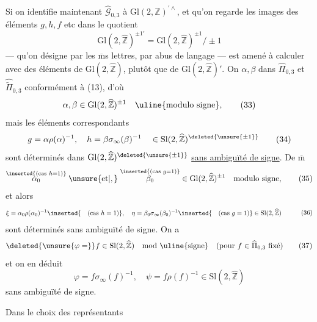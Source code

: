 
Si on identifie maintenant $\widehat{\mathcal G}_{0,3}$ à $\mathrm{Gl}(2,\mathbb Z)^{\prime\wedge}$, et qu'on regarde les  images des éléments $g,h,f$ etc dans le quotient
\[
 \mathrm{Gl}(2,\widehat{\mathbb Z})^{\pm1\prime}
 =\mathrm{Gl}(2,\widehat{\mathbb Z})^{\pm1}/\pm1
\]
--- qu'on désigne par les $\overline{\mathrm m}$s lettres, par abus de langage ---  est amené à calculer avec des éléments de $\mathrm{Gl}(2,\widehat{\mathbb Z})$, plutôt que de $\mathrm{Gl}(2,\widehat{\mathbb Z})'$. On  $\alpha,\beta$ dans $\widehat{\Pi}_{0,3}$ et $\widehat{\widetilde{\Pi}}_{0,3}$ conformément à (13), d'où
\[
 \alpha,\beta\in\mathrm{Gl}(2,\widehat{\mathbb Z})^{\pm1}
 \quad\text{\uline{modulo signe}},
 \tag{33}
\]
mais les éléments correspondants
\[
 g=\alpha\rho(\alpha)^{-1},\quad
 h=\beta\sigma_\infty(\beta)^{-1}
 \quad\in\mathrm{Sl}(2,\widehat{\mathbb Z})^{\deleted{\unsure{\pm1}}}
 \tag{34}
\]
sont déterminés dans $\mathrm{Gl}(2,\widehat{\mathbb Z})^{\deleted{\unsure{\pm1}}}$ \uline{sans ambiguïté de signe}. De $\overline{\mathrm m}$
\[
 \overset{\inserted{\text{(cas }h=1\text{)}}}{\alpha_0}
 \;\unsure{\text{et}|,}\;
 \overset{\inserted{\text{(cas }g=1\text{)}}}{\beta_0}
 \in\mathrm{Gl}(2,\widehat{\mathbb Z})^{\pm1}
 \quad\text{modulo signe},
 \tag{35}
\]
et alors
\[
 \begin{aligned}
 \xi&=\alpha_0\rho(\alpha_0)^{-1}
 \inserted{\quad\text{(cas }h=1\text{)}},\quad
 \eta=\beta_0\sigma_\infty(\beta_0)^{-1}
 \inserted{\quad\text{(cas }g=1\text{)}}
 \in\mathrm{Sl}(2,\widehat{\mathbb Z})
 \end{aligned}
 \tag{36}
\]
sont déterminés sans ambiguïté de signe. On a
\[
 \deleted{\unsure{\varphi=} }f\in\mathrm{Sl}(2,\widehat{\mathbb Z})
 \quad\text{mod \uline{signe}}
 \quad\text{(pour }f\in\widehat{\Pi}_{0,3}\text{ fixé)}
 \tag{37}
\]
et on en déduit
\[
 \varphi=f\sigma_\infty(f)^{-1},\quad
 \psi=f\rho(f)^{-1}\in\mathrm{Sl}(2,\widehat{\mathbb Z})
 \tag{38}
\]
sans ambiguïté de signe.

 Dans le choix des  représentants



